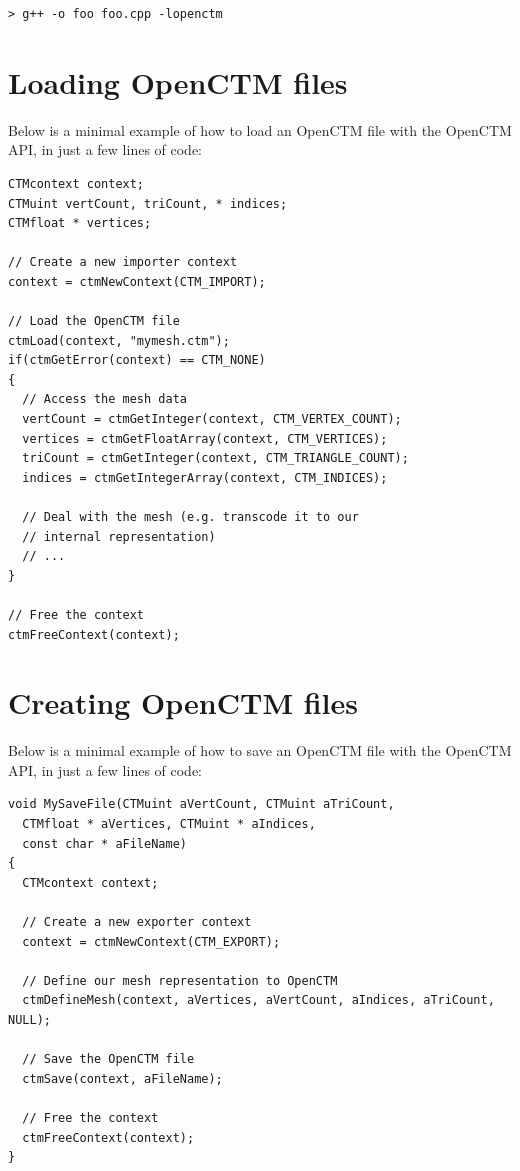 \begin{lstlisting}
> g++ -o foo foo.cpp -lopenctm
\end{lstlisting}


\section{Loading OpenCTM files}
Below is a minimal example of how to load an OpenCTM file with the OpenCTM API,
in just a few lines of code:

\begin{lstlisting}
CTMcontext context;
CTMuint vertCount, triCount, * indices;
CTMfloat * vertices;

// Create a new importer context
context = ctmNewContext(CTM_IMPORT);

// Load the OpenCTM file
ctmLoad(context, "mymesh.ctm");
if(ctmGetError(context) == CTM_NONE)
{
  // Access the mesh data
  vertCount = ctmGetInteger(context, CTM_VERTEX_COUNT);
  vertices = ctmGetFloatArray(context, CTM_VERTICES);
  triCount = ctmGetInteger(context, CTM_TRIANGLE_COUNT);
  indices = ctmGetIntegerArray(context, CTM_INDICES);

  // Deal with the mesh (e.g. transcode it to our
  // internal representation)
  // ...
}

// Free the context
ctmFreeContext(context);
\end{lstlisting}


\section{Creating OpenCTM files}
Below is a minimal example of how to save an OpenCTM file with the OpenCTM API,
in just a few lines of code:

\begin{lstlisting}
void MySaveFile(CTMuint aVertCount, CTMuint aTriCount,
  CTMfloat * aVertices, CTMuint * aIndices,
  const char * aFileName)
{
  CTMcontext context;

  // Create a new exporter context
  context = ctmNewContext(CTM_EXPORT);

  // Define our mesh representation to OpenCTM
  ctmDefineMesh(context, aVertices, aVertCount, aIndices, aTriCount, NULL);

  // Save the OpenCTM file
  ctmSave(context, aFileName);

  // Free the context
  ctmFreeContext(context);
}
\end{lstlisting}




